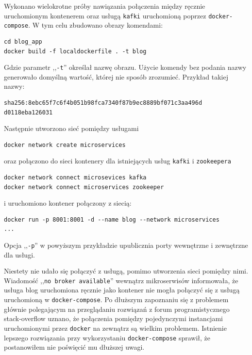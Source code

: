 \documentclass[12pt,twoside]{article}
\begin{document}
Wykonano wielokrotne próby nawiązania połączenia między ręcznie uruchomionym kontenerem oraz usługą \texttt{kafki} uruchomioną poprzez \texttt{docker-compose}. W tym celu zbudowano obrazy komendami:
\begin{lstlisting}
cd blog_app
docker build -f localdockerfile . -t blog
\end{lstlisting}
Gdzie parametr ,,\texttt{-t}'' określał nazwę obrazu. Użycie komendy bez podania nazwy generowało domyślną wartość, której nie sposób zrozumieć. Przykład takiej nazwy:
\begin{lstlisting}[breaklines]
sha256:8ebc65f7c6f4b051b98fca7340f87b9ec8889bf071c3aa496d
d0118eba126031
\end{lstlisting}
Następnie utworzono sieć pomiędzy usługami
\begin{lstlisting}
docker network create microservices
\end{lstlisting}
oraz połączono do sieci kontenery dla istniejących usług \texttt{kafki} i \texttt{zookeepera}
\begin{lstlisting}
docker network connect microsevices kafka
docker network connect microservices zookeeper
\end{lstlisting}
i uruchomiono kontener połączony z siecią:
\begin{lstlisting}
docker run -p 8001:8001 -d --name blog --network microservices
...
\end{lstlisting}
Opcja ,,\texttt{-p}'' w powyższym przykładzie upublicznia porty wewnętrzne i zewnętrzne dla usługi.

Niestety nie udało się połączyć z usługą, pomimo utworzenia sieci pomiędzy nimi. Wiadomość ,,\texttt{no broker available}'' wewnątrz mikroserwisów informowała, że usługa blog uruchomiona ręcznie jako kontener nie mogła połączyć się z usługą uruchomioną w \texttt{docker-compose}. Po dłuższym zapoznaniu się z problemem głównie polegającym na przeglądaniu rozwiązań z forum programistycznego stack-overflow uznano, że połączenia pomiędzy pojedynczymi instancjami uruchomionymi przez \texttt{docker} na zewnątrz są wielkim problemem. Istnienie lepszego rozwiązania przy wykorzystaniu \texttt{docker-compose} sprawił, że postanowiłem nie poświęcić mu dłuższej uwagi.
\end{document}
